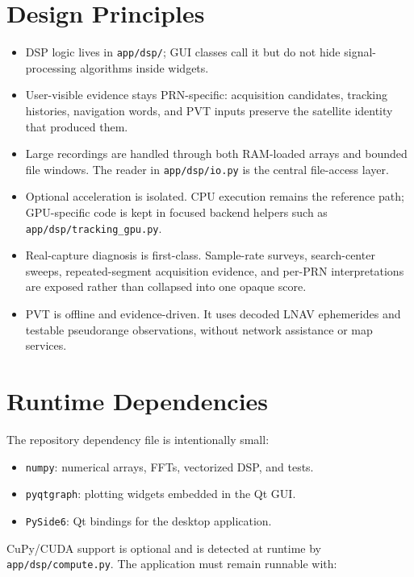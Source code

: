 \documentclass[11pt,a4paper]{article}
\newcommand{\codepath}[1]{\nolinkurl{#1}}
\begin{document}
\section{Design Principles}

\begin{itemize}
  \item DSP logic lives in \codepath{app/dsp/}; GUI classes call it but do not hide signal-processing algorithms inside widgets.
  \item User-visible evidence stays PRN-specific: acquisition candidates, tracking histories, navigation words, and PVT inputs preserve the satellite identity that produced them.
  \item Large recordings are handled through both RAM-loaded arrays and bounded file windows. The reader in \codepath{app/dsp/io.py} is the central file-access layer.
  \item Optional acceleration is isolated. CPU execution remains the reference path; GPU-specific code is kept in focused backend helpers such as \codepath{app/dsp/tracking_gpu.py}.
  \item Real-capture diagnosis is first-class. Sample-rate surveys, search-center sweeps, repeated-segment acquisition evidence, and per-PRN interpretations are exposed rather than collapsed into one opaque score.
  \item PVT is offline and evidence-driven. It uses decoded LNAV ephemerides and testable pseudorange observations, without network assistance or map services.
\end{itemize}

\section{Runtime Dependencies}

The repository dependency file is intentionally small:

\begin{itemize}
  \item \texttt{numpy}: numerical arrays, FFTs, vectorized DSP, and tests.
  \item \texttt{pyqtgraph}: plotting widgets embedded in the Qt GUI.
  \item \texttt{PySide6}: Qt bindings for the desktop application.
\end{itemize}

CuPy/CUDA support is optional and is detected at runtime by \codepath{app/dsp/compute.py}. The application must remain runnable with:
\end{document}
